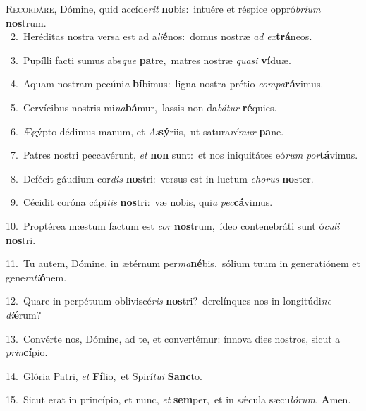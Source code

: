 \lettrine{\initial\textcolor{\initialcolor}{R}}{ecordáre,} Dómine, quid accíde\textit{rit} \textbf{no}\-bis:~\star intuére et réspice oppró\-\textit{bri}\-\textit{um} \textbf{nos}\-trum.\\
{\numbfont\textcolor{\numbcolor}{~2.}}~Heréditas nostra versa est ad a\-\textit{li}\-\textbf{é}nos:~\star domus nostræ \textit{ad} \textit{ex}\-\textbf{trá}neos.\par
{\numbfont\textcolor{\numbcolor}{~3.}}~Pupílli facti sumus abs\textit{que} \textbf{pa}\-tre,~\star matres nostræ \textit{qua}\-\textit{si} \textbf{ví}\-duæ.\par
{\numbfont\textcolor{\numbcolor}{~4.}}~Aquam nostram pecúni\textit{a} \textbf{bí}\-bimus:~\star ligna nostra prétio \textit{com}\-\textit{pa}\textbf{rá}vimus.\par
{\numbfont\textcolor{\numbcolor}{~5.}}~Cervícibus nostris mi\-\textit{na}\-\textbf{bá}mur,~\star lassis non da\-\textit{bá}\-\textit{tur} \textbf{ré}\-quies.\par
{\numbfont\textcolor{\numbcolor}{~6.}}~Ægýpto dédimus manum, et \textit{As}\-\textbf{sý}riis,~\star ut satura\-\textit{ré}\-\textit{mur} \textbf{pa}\-ne.\par
{\numbfont\textcolor{\numbcolor}{~7.}}~Patres nostri peccavérunt, \textit{et} \textbf{non} sunt:~\star et nos iniquitátes eó\textit{rum} \textit{por}\-\textbf{tá}vimus.\par
{\numbfont\textcolor{\numbcolor}{~8.}}~Defécit gáudium cor\textit{dis} \textbf{nos}\-tri:~\star versus est in luctum \textit{cho}\-\textit{rus} \textbf{nos}\-ter.\par
{\numbfont\textcolor{\numbcolor}{~9.}}~Cécidit coróna cápi\textit{tis} \textbf{nos}\-tri:~\star væ nobis, qui\textit{a} \textit{pec}\-\textbf{cá}vimus.\par
{\numbfont\textcolor{\numbcolor}{10.}}~Proptérea mæstum factum est \textit{cor} \textbf{nos}\-trum,~\star ídeo contenebráti sunt ó\-\textit{cu}\-\textit{li} \textbf{nos}\-tri.\par
{\numbfont\textcolor{\numbcolor}{11.}}~Tu autem, Dómine, in ætérnum per\-\textit{ma}\-\textbf{né}bis,~\star sólium tuum in generatiónem et gene\-\textit{ra}\-\textit{ti}\textbf{ó}nem.\par
{\numbfont\textcolor{\numbcolor}{12.}}~Quare in perpétuum obliviscé\textit{ris} \textbf{nos}\-tri?~\star derelínques nos in longitúdi\textit{ne} \textit{di}\-\textbf{é}rum?\par
{\numbfont\textcolor{\numbcolor}{13.}}~Convérte nos, Dómine, ad te, et convertémur: ínnova dies nostros, sicut a \textit{prin}\-\textbf{cí}pio.\par
{\numbfont\textcolor{\numbcolor}{14.}}~Glória Patri, \textit{et} \textbf{Fí}\-lio,~\star et Spirí\-\textit{tu}\-\textit{i} \textbf{Sanc}\-to.\par
{\numbfont\textcolor{\numbcolor}{15.}}~Sicut erat in princípio, et nunc, \textit{et} \textbf{sem}\-per,~\star et in sǽcula sæcu\-\textit{ló}\-\textit{rum}. \textbf{A}\-men.\par
